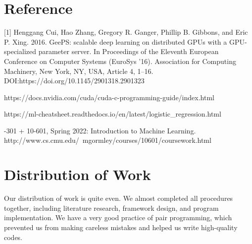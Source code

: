 \documentclass{article}
\begin{document}
\section*{Reference}
[1] Henggang Cui, Hao Zhang, Gregory R. Ganger, Phillip B. Gibbons, and Eric P. Xing. 2016. GeePS: scalable deep learning on distributed GPUs with a GPU-specialized parameter server. In Proceedings of the Eleventh European Conference on Computer Systems (EuroSys '16). Association for Computing Machinery, New York, NY, USA, Article 4, 1–16. DOI:https://doi.org/10.1145/2901318.2901323

\noindent[2] https://docs.nvidia.com/cuda/cuda-c-programming-guide/index.html

\noindent[3] https://ml-cheatsheet.readthedocs.io/en/latest/logistic_regression.html

-301 + 10-601, Spring 2022: Introduction to Machine Learning. http://www.cs.cmu.edu/~mgormley/courses/10601/coursework.html


\section*{Distribution of Work}
Our distribution of work is quite even. We almost completed all procedures together, including literature research, framework design, and program implementation. We have a very good practice of pair programming, which prevented us from making careless mistakes and helped us write high-quality codes.
\end{document}
